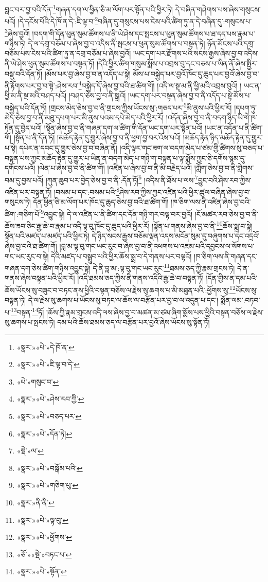 བླང་བར་བྱ་བའི་དོན་\footnote{«སྣར་»«པེ་»དེ་ཁོ་ན་}གཞན་དག་ལ་ཕྱིན་ཅི་མ་ལོག་པར་སྟོན་པའི་ཕྱིར་ཏེ། དེ་བཞིན་གཤེགས་པས་ཞེས་གསུངས་པའོ། །དེ་དངོས་པོའི་དེ་ཁོ་ན་དེ་:ཇི་ལྟ་བ་\footnote{«སྣར་»«པེ་»ཇི་ལྟ་བ་དེ་}བཞིན་དུ་གསུངས་པས་ངེས་པའི་ཚིག་ཏུ་ན་དེ་བཞིན་དུ་:གསུངས་པ་\footnote{«པེ་»གསུང་བ་}ཞེས་བྱའོ། །བདག་གི་དོན་ཕུན་སུམ་ཚོགས་པ་ནི་ཡེ་ཤེས་དང་སྤངས་པ་ཕུན་སུམ་ཚོགས་པ་ཐ་དད་པས་རྣམ་པ་གཉིས་ཏེ། དེ་ལ་དགྲ་བཅོམ་པ་ཞེས་བྱ་བ་འདིས་ནི་སྤངས་པ་ཕུན་སུམ་ཚོགས་པ་བསྟན་ཏེ། ཉོན་མོངས་པའི་དགྲ་བཅོམ་པས་ངེས་པའི་ཚིག་ཏུ་ན་དགྲ་བཅོམ་པ་ཞེས་བྱའོ། །ཡང་དག་པར་རྫོགས་པའི་སངས་རྒྱས་ཞེས་བྱ་བ་འདིས་ནི་ཡེ་ཤེས་ཕུན་སུམ་ཚོགས་པ་བསྟན་ཏོ། །དེའི་ཕྱིར་ཚིག་གསུམ་སྨོས་པ་འབྲས་བུ་དང་བཅས་པ་ཡིན་ནོ་ཞེས་སྤྱིར་བསྡུ་བའི་དོན་ཏོ། །མོས་པར་བྱ་ཞེས་བྱ་བ་ན་འདོད་པ་སྟེ། མོས་པ་བསྐྱེད་པར་བྱའོ་ཁོང་དུ་ཆུད་པར་བྱའོ་ཞེས་བྱ་བ་ནི་རྟོགས་པར་བྱ་བ་སྟེ་:ཤེས་རབ་\footnote{«སྣར་»«པེ་»ཤེས་རབ་ཀྱི་}བསྐྱེད་དོ་ཞེས་བྱ་བའི་ཐ་ཚིག་གོ། །འདི་ལ་སྔ་མ་ནི་ཕྱི་མའི་འབྲས་བུའོ། །
ཡང་ན་ཕྱི་མ་ནི་སྔ་མའི་བཤད་པའོ། །བཤད་ཅེས་བྱ་བ་ནི་སྒྲའོ། །ཡང་དག་པར་བསྟན་ཞེས་བྱ་བ་ནི་འདོད་པ་སྟེ་མོས་པ་བསྐྱེད་པའི་དོན་ཏོ། །གྲངས་མེད་ཅེས་བྱ་བ་ནི་གྲངས་ཀྱིས་ཡོངས་སུ་:གཅད་པར་\footnote{«སྣར་»«པེ་»བཅད་པར་}མི་ནུས་པའི་ཕྱིར་རོ། །དཔག་ཏུ་མེད་ཅེས་བྱ་བ་ནི་མཐུ་དཔག་པར་མི་ནུས་པའམ་དཔེ་མེད་པའི་ཕྱིར་རོ། །འདོན་ཞེས་བྱ་བ་ནི་བདག་ཉིད་ཡི་གེ་ཁ་ཏོན་དུ་བྱེད་པའོ། །སྟོན་ཞེས་བྱ་བ་ནི་གཞན་དག་ལ་ཚིག་གི་དོན་ཡང་དག་པར་སྟོན་པའོ། །ཡང་ན་འདོན་པ་ནི་ཚིག་གོ། །སྟོན་པ་ནི་དོན་ཏོ། །མཆོད་རྟེན་དུ་གྱུར་ཞེས་བྱ་བ་ནི་ཕྱག་བྱ་བར་འོས་པའོ། །མཆོད་རྟེན་ཉིད་མཆོད་རྟེན་དུ་གྱུར་པ་སྟེ། དཔེར་ན་དབང་དུ་གྱུར་ཅེས་བྱ་བ་བཞིན་ནོ། །འདི་ལྟར་གང་ཟག་ལ་བདག་མེད་པ་ཙམ་གྱི་ཚིགས་སུ་བཅད་པ་བསྟན་པས་ཀྱང་མཆོད་རྟེན་དུ་གྱུར་པ་ཡིན་ན་བདག་མེད་པ་གཉི་ག་བསྟན་པ་ལྟ་སྨོས་ཀྱང་ཅི་དགོས་སྙམ་དུ་དགོངས་པའོ། །ལེན་པ་ཞེས་བྱ་བ་ནི་ཚིག་གོ། །འཛིན་པ་ཞེས་བྱ་བ་ནི་མི་བརྗེད་པའོ། །ཀློག་ཅེས་བྱ་བ་ནི་གླེགས་བམ་དུ་བྱས་པའོ། །ཀུན་ཆུབ་པར་བྱེད་ཅེས་བྱ་བ་ནི་:དོན་ཏོ།\footnote{«སྣར་»«པེ་»དོན་ཏེ།} །འདིས་ནི་ཐོས་པ་ལས་\footnote{«སྡེ་»ལ་}བྱུང་བའི་ཤེས་རབ་ཀྱིས་འཛིན་པར་བསྟན་ཏོ། །བསམ་པ་དང་:བསམ་པའི་\footnote{«སྣར་»«པེ་»བསྒོམ་པའི་}ཤེས་རབ་ཀྱིས་ཀྱང་འཛིན་པའི་ཕྱིར་ཚུལ་བཞིན་ཞེས་བྱ་བ་གསུངས་ཏེ། དོན་ཕྱིན་ཅི་མ་ལོག་པར་ཁོང་དུ་ཆུད་ཅེས་བྱ་བའི་ཐ་ཚིག་གོ། །ཁ་ཅིག་ལས་ནི་འཛིན་ཞེས་བྱ་བའི་ཚིག་:གཅིག་པོ་\footnote{«སྣར་»«པེ་»གཅིག་པུ་}འབྱུང་སྟེ། དེ་ལ་འཛིན་པ་ནི་ཚིག་དང་དོན་གཉི་གར་བལྟ་བར་བྱའོ། །ངོ་མཚར་རབ་ཅེས་བྱ་བ་ནི་ཆོས་ཟབ་ཅིང་རྒྱ་ཆེ་བ་རྣམ་པ་འདི་ལྟ་བུ་ཁོང་དུ་ཆུད་པའི་ཕྱིར་རོ། །སྟོན་པ་གནས་ཞེས་བྱ་བ་ནི་\footnote{«སྣར་»ནི་ནི་}ཆོས་སྨྲ་བ་སྟེ། སྟོན་པའི་མཛད་པ་མཛད་པའི་ཕྱིར་ཏེ། དེ་ཉིད་སངས་རྒྱས་བཅོམ་ལྡན་འདས་མངོན་སུམ་དུ་བཞུགས་པ་དང་འདྲའོ་ཞེས་བྱ་བའི་ཐ་ཚིག་གོ། །བླ་མ་ལྟ་བུ་གང་ཡང་རུང་བ་ཞེས་བྱ་བ་ནི་འཕགས་པ་འཇམ་པའི་དབྱངས་ལ་སོགས་པ་གང་ཡང་རུང་བ་སྟེ། དེའི་མཛད་པ་བསྒྲུབ་པའི་ཕྱིར་ཆོས་སྨྲ་བ་དེ་གནས་པར་བལྟའོ། །ཁ་ཅིག་ལས་ནི་གཞན་དང་གཞན་དག་ཅེས་ཚིག་གཉིས་འབྱུང་སྟེ། དེ་ནི་བླ་མ་:ལྟ་བུ་གང་ཡང་རུང་\footnote{«སྣར་»«པེ་»ལྟ་བུ་}ཐམས་ཅད་ཀྱི་རྣམ་གྲངས་ཏེ། དེ་ན་གནས་ཞེས་བསྟན་པའི་ཕྱིར་རོ། །འདི་ཐམས་ཅད་ཀྱིས་ནི་གནས་འདིའི་རྒྱ་ཆེ་བ་བསྟན་ཏོ། །དོན་གྱིས་ན་དམ་པའི་ཆོས་ཡོངས་སུ་བཟུང་བ་བཏང་ནས་ཕྱིའི་བསྟན་བཅོས་ལ་རྗེས་སུ་ཆགས་པ་མི་མཐུན་པའི་:ཕྱོགས་སུ་\footnote{«སྣར་»«པེ་»ཕྱོགས་}ཡོངས་སུ་བསྟན་ཏེ། དེ་ལ་རྗེས་སུ་ཆགས་པ་ཡོངས་སུ་བཏང་ལ་ཆོས་ལ་བརྩོན་པར་བྱ་བ་ལ་འདུན་པ་དང་། སྨོན་ལམ་:བཏབ་པ་\footnote{«ཅོ་»«སྡེ་»བཏང་པ་}བསྟན་\footnote{«སྣར་»«པེ་»སྟོན་}ཏོ། །ཆོས་ཀྱི་རྣམ་གྲངས་འདི་ལས་ཞེས་བྱ་བ་མཚན་མ་ཙམ་ཞིག་སྨོས་པས་ཕྱིའི་བསྟན་བཅོས་ལ་རྗེས་སུ་ཆགས་པ་སྤངས་ཏེ། དམ་པའི་ཆོས་ཐམས་ཅད་ལ་བརྩོན་པར་བྱའོ་ཞེས་ཡོངས་སུ་སྟོན་ཏོ། 